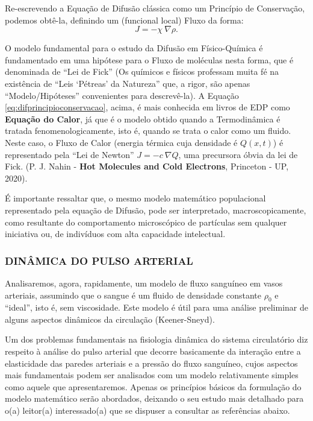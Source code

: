 Re-escrevendo a Equação de Difusão clássica como um Princípio de Conservação, podemos obtê-la, definindo um (funcional local) Fluxo da forma:
\begin{equation}\label{eq:difprincipioconservacao}
J = -\chi\ \nabla \rho.
\end{equation}

O modelo fundamental para o estudo da Difusão em Físico-Química é fundamentado em uma hipótese para o Fluxo de moléculas nesta forma, que é denominada de ``Lei de Fick'' (Os químicos e físicos professam muita fé na existência de ``Leis `Pétreas' da Natureza'' que, a rigor, são apenas ``Modelo/Hipóteses'' convenientes para descrevê-la). A Equação \eqref{eq:difprincipioconservacao}, acima, é mais conhecida em livros de EDP como \textbf{Equação do Calor}, já que é o modelo obtido quando a Termodinâmica é tratada fenomenologicamente, isto é, quando se trata o calor como um fluido. Neste caso, o Fluxo de Calor (energia térmica cuja densidade é \(Q(x,t)\)) é representado pela ``Lei de Newton'' \(J = -c\ \nabla Q\), uma precursora óbvia da lei de Fick. (P. J. Nahin - \textbf{Hot Molecules and Cold Electrons}, Princeton - UP, 2020).

É importante ressaltar que, o mesmo modelo matemático populacional representado pela equação de Difusão, pode ser interpretado, macroscopicamente, como resultante do comportamento microscópico de partículas sem qualquer iniciativa ou, de indivíduos com alta capacidade intelectual.

\subsubsection{DINÂMICA DO PULSO ARTERIAL}

Analisaremos, agora, rapidamente, um modelo de fluxo sanguíneo em vasos arteriais, assumindo que o sangue é um fluido de densidade constante \(\rho_0\) e ``ideal'', isto é, sem viscosidade. Este modelo é útil para uma análise preliminar de alguns aspectos dinâmicos da circulação (Keener-Sneyd).


Um dos problemas fundamentais na fisiologia dinâmica do sistema circulatório diz respeito à análise do pulso arterial que decorre basicamente da interação entre a elasticidade das paredes arteriais e a pressão do fluxo sanguíneo, cujos aspectos mais fundamentais podem ser analisados com um modelo relativamente simples como aquele que apresentaremos. Apenas os princípios básicos da formulação do modelo matemático serão abordados, deixando o seu estudo mais detalhado para o(a) leitor(a) interessado(a) que se dispuser a consultar as referências abaixo.

